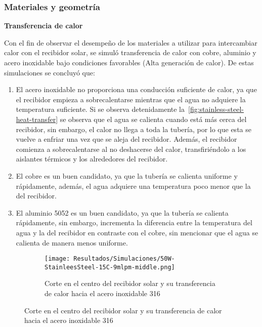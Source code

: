 			\subsubsection{Materiales y geometría}
			
				\textbf{Transferencia de calor}\par
			
				Con el fin de observar el desempeño de los materiales a utilizar para intercambiar calor con el recibidor solar, se simuló transferencia de calor con cobre, aluminio y acero inoxidable bajo condiciones favorables (Alta generación de calor). De estas simulaciones se concluyó que:
				
				\begin{enumerate}
					\item El acero inoxidable no proporciona una conducción suficiente de calor, ya que el recibidor empieza a sobrecalentarse mientras que el agua no adquiere la temperatura suficiente. Si se observa detenidamente la~\cref{fig:stainless-steel-heat-transfer} se observa que el agua se calienta cuando está más cerca del recibidor, sin embargo, el calor no llega a toda la tubería, por lo que esta se vuelve a enfriar una vez que se aleja del recibidor. Además, el recibidor comienza a sobrecalentarse al no deshacerse del calor, transfiriéndolo a los aislantes térmicos y los alrededores del recibidor. 
					\item El cobre es un buen candidato, ya que la tubería se calienta uniforme y rápidamente, además, el agua adquiere una temperatura poco menor que la del recibidor.
					
					\item El aluminio 5052 es un buen candidato, ya que la tubería se calienta rápidamente, sin embargo, incrementa la diferencia entre la temperatura del agua y la del recibidor en contraste con el cobre, sin mencionar que el agua se calienta de manera menos uniforme.
				\end{enumerate}
				
				\begin{figure}[H]
					\centering
					\begin{subfigure}[t]{\linewidth}
						\centering
						\texttt{[image: Resultados/Simulaciones/50W-StainleesSteel-15C-9mlpm-middle.png]}
						\caption{Corte en el centro del recibidor solar y su transferencia de calor hacia el acero inoxidable 316}
						\label{fig:50W-StainleesSteel-15C-9mlpm-middle}
					\end{subfigure}
				\end{figure}

